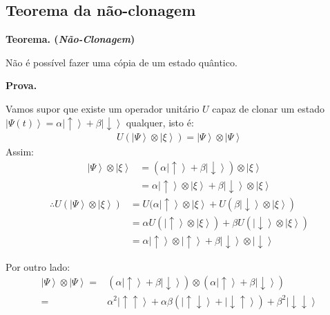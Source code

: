 \documentclass{beamer}
\newcommand{\teorema}[1]{%
	\textbf{Teorema. (\emph{#1})\\}
}
\newcommand{\prova}{%
	\textbf{Prova.\\}
}
\newcommand{\ket}[1]{\ensuremath{\left|#1\right\rangle}}
\begin{document}
	\begin{frame}{\subsecname}
	
	\end{frame}
	
	\subsection{Teorema da não-clonagem}
	
	
	\begin{frame}{\subsecname}
	
	\teorema{Não-Clonagem}
		Não é possível fazer uma cópia de um estado quântico.
	\end{frame}
	
	\begin{frame}{\subsecname}
	\prova
	Vamos supor que existe um operador unitário $U$ capaz de clonar um estado $\ket{\Psi(t)} = \alpha \ket{\uparrow} + \beta \ket{\downarrow}$ qualquer, isto é:
		\begin{align*}
			U (\ket{\Psi} \otimes \ket{\xi}) = \ket{\Psi} \otimes \ket{\Psi}
		\end{align*}
	Assim:
		\begin{align*}
			\ket{\Psi} \otimes \ket{\xi} &= (\alpha \ket{\uparrow} + \beta \ket{\downarrow}) \otimes \ket{\xi}\\
			&= \alpha \ket{\uparrow} \otimes \ket{\xi} + \beta \ket{\downarrow} \otimes \ket{\xi}
		\end{align*}
		\begin{align*}
			\therefore U(\ket{\Psi} \otimes \ket{\xi}) &= U(\alpha \ket{\uparrow} \otimes \ket{\xi} + U(\beta \ket{\downarrow} \otimes \ket{\xi})\\
			&= \alpha U(\ket{\uparrow} \otimes \ket{\xi}) + \beta U(\ket{\downarrow} \otimes \ket{\xi})\\
			&= \alpha \ket{\uparrow} \otimes \ket{\uparrow} + \beta \ket{\downarrow} \otimes \ket{\downarrow}
		\end{align*}
	\end{frame}
	
	\begin{frame}{\subsecname}
	Por outro lado:
		\begin{align*}
		\ket{\Psi} \otimes \ket{\Psi} =& (\alpha \ket{\uparrow} + \beta \ket{\downarrow}) \otimes (\alpha \ket{\uparrow} + \beta \ket{\downarrow})\\
		=& \alpha^2 \ket{\uparrow\uparrow} + \alpha\beta (\ket{\uparrow\downarrow} + \ket{\downarrow\uparrow}) + \beta^2 \ket{\downarrow\downarrow}
		\end{align*}
	\end{frame}	
	
\end{document}

